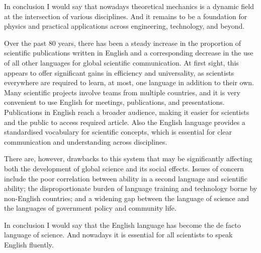 \documentclass[main.tex]{subfiles}
\begin{document}
In conclusion I would say that nowadays theoretical mechanics is a dynamic field at the intersection of various disciplines.
And it remains to be a foundation for physics and practical applications across engineering, technology, and beyond.
\\


\newpage

\setcounter{subsection}{8}

Over the past 80 years, there has been a steady increase in the proportion of scientific publications written in English and a corresponding decrease in the use of all other languages for global scientific communication.
At first sight, this appears to offer significant gains in efficiency and universality, as scientists everywhere are required to learn, at most, one language in addition to their own.
Many scientific projects involve teams from multiple countries, and it is very convenient to use English for meetings, publications, and presentations.
Publications in English reach a broader audience, making it easier for scientists and the public to access required article.
Also the English language provides a standardised vocabulary for scientific concepts, which is essential for clear communication and understanding across disciplines.

There are, however, drawbacks to this system that may be significantly affecting both the development of global science and its social effects.
Issues of concern include the poor correlation between ability in a second language and scientific ability; the disproportionate burden of language training and technology borne by non-English countries; and a widening gap between the language of science and the languages of government policy and community life.

In conclusion I would say that the English language has become the de facto language of science. And nowadays it is essential for all scientists to speak English fluently.
\\

\end{document}
